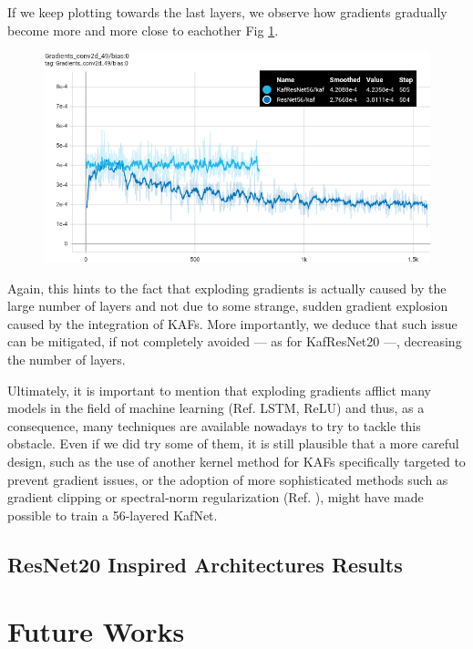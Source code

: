 \documentclass[LaM,binding=0.6cm]{./packages/sapthesis/sapthesis}
\begin{document}
        If we keep plotting towards the last layers, we observe how gradients gradually become more and more close to eachother Fig \ref{fig:gradconv49}.
        \begin{figure}[h!]
            \centering
            \includegraphics[scale=0.38]{gradconv45.png}
            \caption{}
            \label{fig:gradconv49}
        \end{figure}
        Again, this hints to the fact that exploding gradients is actually caused by the large number of layers and not due to some strange, sudden gradient explosion caused by the integration of KAFs.
        More importantly, we deduce that such issue can be mitigated, if not completely avoided — as for KafResNet20 —, decreasing the number of layers.
        
        Ultimately, it is important to mention that exploding gradients afflict many models in the field of machine learning (Ref. LSTM, ReLU) and thus, as a consequence, many techniques are available nowadays to try to tackle this obstacle. 
        Even if we did try some of them, it is still plausible that a more careful design, such as the use of another kernel method for KAFs specifically targeted to prevent gradient issues, or the adoption of more 
        sophisticated methods such as gradient clipping or spectral-norm regularization (Ref. ), might have made possible to train a 56-layered KafNet.  

    \section{ResNet20 Inspired Architectures Results}


\chapter{Future Works}
\end{document}

